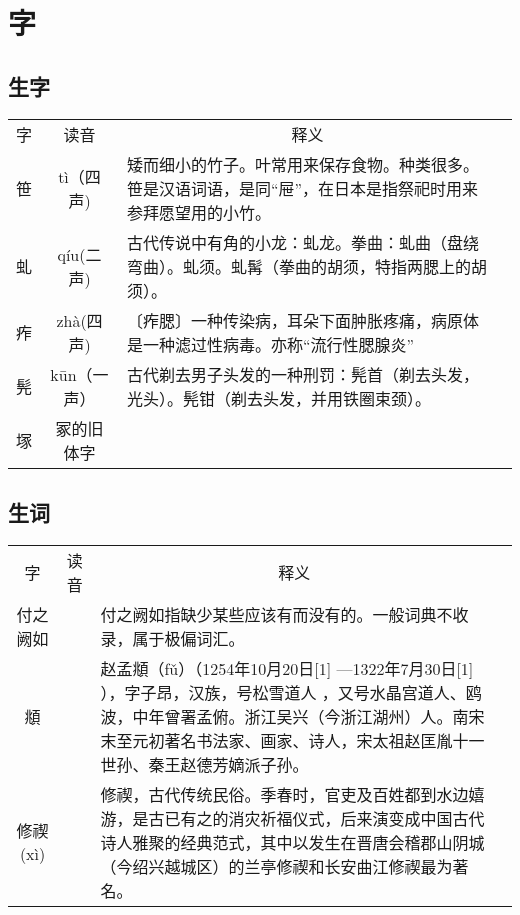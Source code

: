 \documentclass[letter]{book}
\begin{document}
\section*{字}



\subsection*{生字}


\begin{tabular}{ccp{8cm}c}
	\hline
	\multirow{1}{*}{字}
	& \multicolumn{1}{c}{读音} 
	& \multicolumn{1}{c}{释义}\\			
		笹    & t\`{i}（四声)       & 矮而细小的竹子。叶常用来保存食物。种类很多。笹是汉语词语，是同“屉”，在日本是指祭祀时用来参拜愿望用的小竹。           \\
	虬 & q\'{i}u(二声)  &古代传说中有角的小龙：虬龙。拳曲：虬曲（盘绕弯曲）。虬须。虬髯（拳曲的胡须，特指两腮上的胡须）。\\
	痄 & zh\`{a}(四声) &  〔痄腮〕一种传染病，耳朵下面肿胀疼痛，病原体是一种滤过性病毒。亦称“流行性腮腺炎” \\
		髡  & k\={u}n（一声） & 古代剃去男子头发的一种刑罚：髡首（剃去头发，光头）。髡钳（剃去头发，并用铁圈束颈）。 \\
		塚 & 冢的旧体字 \\
	\hline
\end{tabular}



\subsection{生词}

\begin{tabular}{ccp{8cm}c}
	\hline
	\multirow{1}{*}{字}
	& \multicolumn{1}{c}{读音} 
	& \multicolumn{1}{c}{释义}\\			
	付之阙如    &       & 付之阙如指缺少某些应该有而没有的。一般词典不收录，属于极偏词汇。         \\
	\hline
	頫 & & 赵孟頫（fǔ）（1254年10月20日[1]  —1322年7月30日[1]  ），字子昂，汉族，号松雪道人 ，又号水晶宫道人、鸥波，中年曾署孟俯。浙江吴兴（今浙江湖州）人。南宋末至元初著名书法家、画家、诗人，宋太祖赵匡胤十一世孙、秦王赵德芳嫡派子孙。\\
	修禊(x\`{i}) & & 修禊，古代传统民俗。季春时，官吏及百姓都到水边嬉游，是古已有之的消灾祈福仪式，后来演变成中国古代诗人雅聚的经典范式，其中以发生在晋唐会稽郡山阴城（今绍兴越城区）的兰亭修禊和长安曲江修禊最为著名。\\
\end{tabular}
\end{document}
